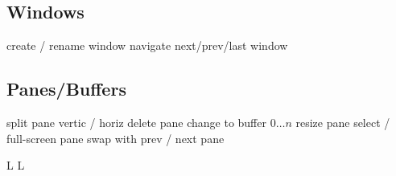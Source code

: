 \subsection{Windows}{}
	{create / rename window}
	{navigate next/prev/last window}

\subsection{Panes/Buffers}{}
	{split pane vertic / horiz}
	{delete pane}
	{change to buffer $0 \ldots n$}
	{resize pane}
	{select / full-screen pane}
	{swap with prev / next pane}

\copyrightnotice

\supereject
\if L\lr \else\null\vfill\eject\fi
\if L\lr \else\null\vfill\eject\fi
\bye

